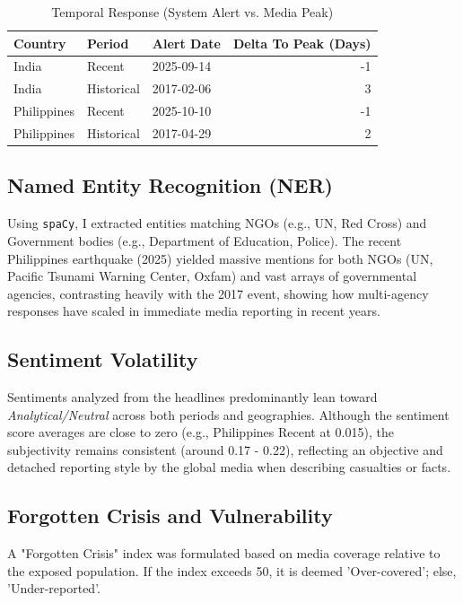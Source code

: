 \documentclass[11pt,a4paper]{article}
\begin{document}
\begin{table}[H]
\centering
\caption{Temporal Response (System Alert vs. Media Peak)}
\begin{tabular}{l l l r}
\toprule
\textbf{Country} & \textbf{Period} & \textbf{Alert Date} & \textbf{Delta To Peak (Days)}\\
\midrule
India & Recent & 2025-09-14 & -1 \\
India & Historical & 2017-02-06 & 3 \\
Philippines & Recent & 2025-10-10 & -1 \\
Philippines & Historical & 2017-04-29 & 2 \\
\bottomrule
\end{tabular}
\end{table}

\subsection{Named Entity Recognition (NER)}
Using \texttt{spaCy}, I extracted entities matching NGOs (e.g., UN, Red Cross) and Government bodies (e.g., Department of Education, Police).
The recent Philippines earthquake (2025) yielded massive mentions for both NGOs (UN, Pacific Tsunami Warning Center, Oxfam) and vast arrays of governmental agencies, contrasting heavily with the 2017 event, showing how multi-agency responses have scaled in immediate media reporting in recent years.

\subsection{Sentiment Volatility}
Sentiments analyzed from the headlines predominantly lean toward \textit{Analytical/Neutral} across both periods and geographies. Although the sentiment score averages are close to zero (e.g., Philippines Recent at 0.015), the subjectivity remains consistent (around 0.17 - 0.22), reflecting an objective and detached reporting style by the global media when describing casualties or facts.

\subsection{Forgotten Crisis and Vulnerability}
A "Forgotten Crisis" index was formulated based on media coverage relative to the exposed population. If the index exceeds 50, it is deemed 'Over-covered'; else, 'Under-reported'. 
\end{document}
